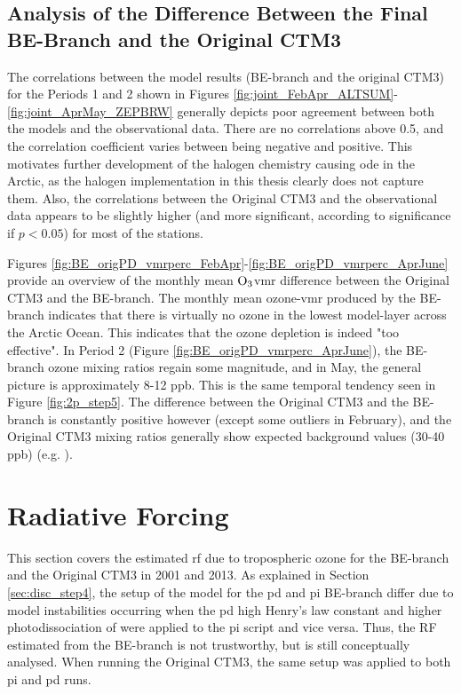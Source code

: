 \subsection{Analysis of the Difference Between the Final BE-Branch and the Original CTM3}\label{sec:disc_origBE}

The correlations between the model results (BE-branch and the original CTM3) for the Periods 1 and 2 shown in Figures \ref{fig:joint_FebApr_ALTSUM}-\ref{fig:joint_AprMay_ZEPBRW} generally depicts poor agreement between both the models and the observational data. There are no correlations above 0.5, and the correlation coefficient varies between being negative and positive. This motivates further development of the halogen chemistry causing \acrshort{ode} in the Arctic, as the halogen implementation in this thesis clearly does not capture them. Also, the correlations between the Original CTM3 and the observational data appears to be slightly higher (and more significant, according to significance if $p<0.05$) for most of the stations. 

\medskip

Figures \ref{fig:BE_origPD_vmrperc_FebApr}-\ref{fig:BE_origPD_vmrperc_AprJune} provide an overview of the monthly mean $\mathrm{O_3}$\acrshort{vmr} difference between the Original CTM3 and the BE-branch. The monthly mean ozone-\acrshort{vmr} produced by the BE-branch indicates that there is virtually no ozone in the lowest model-layer across the Arctic Ocean. This indicates that the ozone depletion is indeed "too effective". In Period 2 (Figure \ref{fig:BE_origPD_vmrperc_AprJune}), the BE-branch ozone mixing ratios regain some magnitude, and in May, the general picture is approximately 8-12 ppb. This is the same temporal tendency seen in Figure \ref{fig:2p_step5}. The difference between the Original CTM3 and the BE-branch is constantly positive however (except some outliers in February), and the Original CTM3 mixing ratios generally show expected background values (30-40 ppb) (e.g. \cite{Peterson2015}). 

\section{Radiative Forcing}\label{sec:disc_RF}

This section covers the estimated \acrshort{rf} due to tropospheric ozone for the BE-branch and the Original CTM3 in 2001 and 2013. As explained in Section \ref{sec:disc_step4}, the setup of the model for the \acrshort{pd} and \acrshort{pi} BE-branch differ due to model instabilities occurring when the \acrshort{pd} high Henry's law constant and higher photodissociation of  were applied to the \acrshort{pi} script and vice versa. Thus, the RF estimated from the BE-branch is not trustworthy, but is still conceptually analysed. When running the Original CTM3, the same setup was applied to both \acrshort{pi} and \acrshort{pd} runs. 

